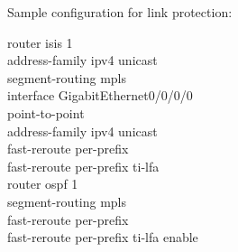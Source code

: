 \vspace{5mm} \noindent
Sample configuration for link protection:

\vspace{1mm} \noindent
\ttfamily
\noindent
router isis 1 \\
\hspace*{1em}address-family ipv4 unicast \\
\hspace*{2em}segment-routing mpls \\

\noindent
interface GigabitEthernet0/0/0/0 \\
\hspace*{1em}point-to-point \\
\hspace*{1em}address-family ipv4 unicast \\
\hspace*{2em}fast-reroute per-prefix \\
\hspace*{2em}fast-reroute per-prefix ti-lfa \\

\noindent
router ospf 1 \\
\hspace*{1em}segment-routing mpls \\
\hspace*{2em}fast-reroute per-prefix \\
\hspace*{2em}fast-reroute per-prefix ti-lfa enable  \\

\rmfamily